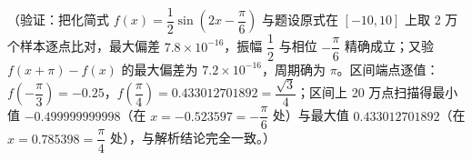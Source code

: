 \begin{answer}
（验证：把化简式 \(f(x)=\dfrac{1}{2}\sin\left(2x-\dfrac{\pi}{6}\right)\) 与题设原式在 \([-10,10]\) 上取 2 万个样本逐点比对，最大偏差 \(7.8\times10^{-16}\)，振幅 \(\dfrac{1}{2}\) 与相位 \(-\dfrac{\pi}{6}\) 精确成立；又验 \(f(x+\pi)-f(x)\) 的最大偏差为 \(7.2\times10^{-16}\)，周期确为 \(\pi\)。区间端点逐值：\(f\left(-\dfrac{\pi}{3}\right)=-0.25\)，\(f\left(\dfrac{\pi}{4}\right)=0.433012701892=\dfrac{\sqrt{3}}{4}\)；区间上 20 万点扫描得最小值 \(-0.499999999998\)（在 \(x=-0.523597=-\dfrac{\pi}{6}\) 处）与最大值 \(0.433012701892\)（在 \(x=0.785398=\dfrac{\pi}{4}\) 处），与解析结论完全一致。）



\end{answer}
